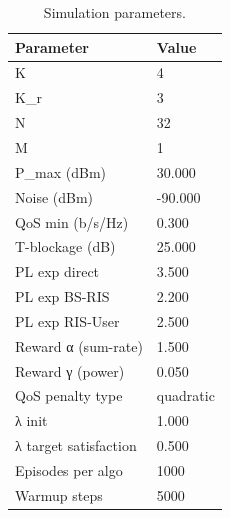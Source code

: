 \begin{table}[t]
\centering
\caption{Simulation parameters.}
\label{tab:simulation_parameters}
\begin{tabular}{ll}
\toprule
Parameter & Value \\
\midrule
K & 4 \\
K\_r & 3 \\
N & 32 \\
M & 1 \\
P\_max (dBm) & 30.000 \\
Noise (dBm) & -90.000 \\
QoS min (b/s/Hz) & 0.300 \\
T-blockage (dB) & 25.000 \\
PL exp direct & 3.500 \\
PL exp BS-RIS & 2.200 \\
PL exp RIS-User & 2.500 \\
Reward α (sum-rate) & 1.500 \\
Reward γ (power) & 0.050 \\
QoS penalty type & quadratic \\
λ init & 1.000 \\
λ target satisfaction & 0.500 \\
Episodes per algo & 1000 \\
Warmup steps & 5000 \\
\bottomrule
\end{tabular}

\end{table}
